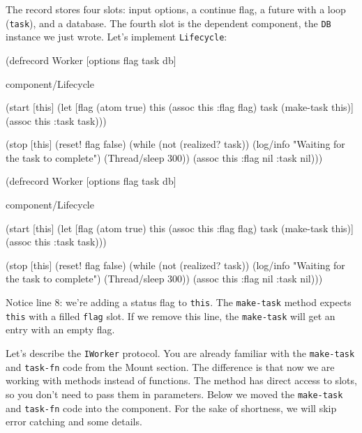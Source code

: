 The record stores four slots: input options, a continue flag, a future with a loop (\verb|task|), and a database. The fourth slot is the dependent component, the \verb|DB| instance we just wrote. Let's implement \verb|Lifecycle|:

\ifnarrow

\begin{english}
  \begin{clojure/lines}
(defrecord Worker
  [options flag task db]

  component/Lifecycle

  (start [this]
    (let [flag (atom true)
          this (assoc this :flag flag)
          task (make-task this)]
      (assoc this :task task)))

  (stop [this]
    (reset! flag false)
    (while (not (realized? task))
      (log/info
        "Waiting for
             the task to complete")
      (Thread/sleep 300))
    (assoc this :flag nil :task nil)))
  \end{clojure/lines}
\end{english}

\else

\begin{english}
  \begin{clojure/lines}
(defrecord Worker
  [options flag task db]

  component/Lifecycle

  (start [this]
    (let [flag (atom true)
          this (assoc this :flag flag)
          task (make-task this)]
      (assoc this :task task)))

  (stop [this]
    (reset! flag false)
    (while (not (realized? task))
      (log/info "Waiting for the task to complete")
      (Thread/sleep 300))
    (assoc this :flag nil :task nil)))
  \end{clojure/lines}
\end{english}

\fi

Notice line 8: we're adding a status flag to \verb|this|. The \verb|make-task| method expects \verb|this| with a filled \verb|flag| slot. If we remove this line, the \verb|make-task| will get an entry with an empty flag.


Let's describe the \verb|IWorker| protocol. You are already familiar with the \verb|make-task| and \verb|task-fn| code from the Mount section. The difference is that now we are working with methods instead of functions. The method has direct access to slots, so you don't need to pass them in parameters. Below we moved the \verb|make-task| and \verb|task-fn| code into the component. For the sake of shortness, we will skip error catching and some details.

